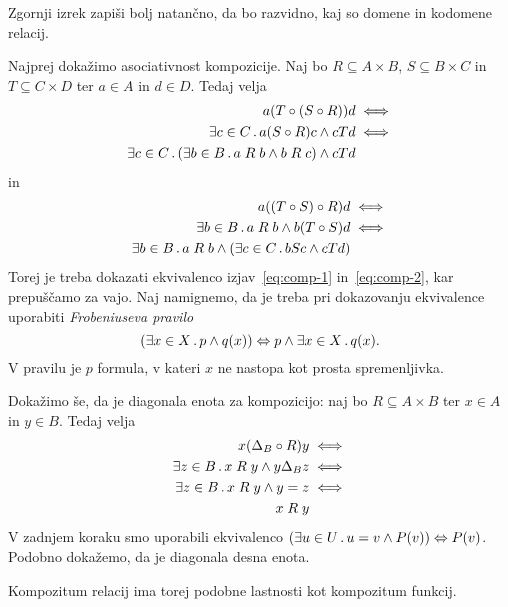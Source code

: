 \begin{naloga}
  Zgornji izrek zapiši bolj natančno, da bo razvidno, kaj so domene in kodomene relacij.
\end{naloga}

\begin{dokaz}
  Najprej dokažimo asociativnost kompozicije.
  Naj bo $R \subseteq A \times B$, $S \subseteq B \times C$ in $T \subseteq C \times D$ ter $a \in A$ in $d \in D$. Tedaj velja
  \begin{align}
    a (T \circ (S \circ R)) d &\iff  \notag \\
    \some{c \in C} a (S \circ R) c \land c T d &\iff \notag \\
    \some{c \in C} (\some{b \in B} a \rel{R} b \land b \rel{R} c) \land c T d \label{eq:comp-1}
  \end{align}
  in
  \begin{align}
    a ((T \circ S) \circ R) d &\iff \notag \\
    \some{b \in B} a \rel{R} b \land b (T \circ S) d &\iff \notag \\
    \some{b \in B} a \rel{R} b \land (\some{c \in C} b S c \land c T d) \label{eq:comp-2}
  \end{align}
  Torej je treba dokazati ekvivalenco izjav~\eqref{eq:comp-1} in~\eqref{eq:comp-2}, kar prepuščamo za vajo. Naj namignemo, da je treba pri dokazovanju ekvivalence uporabiti \emph{Frobeniuseva pravilo}
  \begin{equation*}
    (\some{x \in X} p \land q(x)) \liff p \land \some{x \in X} q(x).
  \end{equation*}
  V pravilu je $p$ formula, v kateri $x$ ne nastopa kot prosta spremenljivka.

  Dokažimo še, da je diagonala enota za kompozicijo: naj bo $R \subseteq A \times B$ ter $x \in A$ in $y \in B$. Tedaj velja
  \begin{align*}
    x (\diag[B] \circ R) y &\iff \\
    \some{z \in B} x \rel{R} y \land y \diag[B] z  &\iff \\
    \some{z \in B} x \rel{R} y \land y = z &\iff \\
    x \rel{R} y
  \end{align*}
  V zadnjem koraku smo uporabili ekvivalenco $(\some{u \in U} u = v \land P(v)) \liff P(v)$. Podobno dokažemo, da je diagonala desna enota.
\end{dokaz}

Kompozitum relacij ima torej podobne lastnosti kot kompozitum funkcij.

